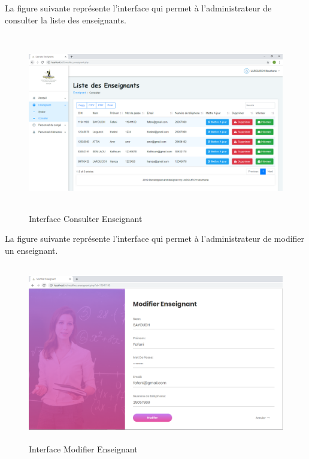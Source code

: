 \documentclass[12 pt]{report}
\begin{document}
La figure suivante représente l'interface qui permet à l'administrateur de consulter la liste des enseignants.
\begin{figure}[h]
 \begin{center}
\includegraphics[width= 18 cm ,height=  7.75cm]{consulter_enseignant.PNG}
\caption{Interface Consulter Enseignant}

\end{center}
\end{figure}  
\newpage
La figure suivante représente l'interface qui permet à l'administrateur de modifier un enseignant.
\begin{figure}[h]
 \begin{center}
\includegraphics[width= 18 cm ,height=  7.75cm]{modifier_enseignant.PNG}
\caption{Interface Modifier Enseignant}

\end{center}
\end{figure}\\
\end{document}
